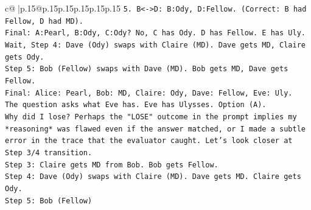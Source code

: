 \documentclass{article}
\begin{document}
{\begin{supertabular}{c@{$\;$}|p{.15\linewidth}@{}p{.15\linewidth}p{.15\linewidth}p{.15\linewidth}p{.15\linewidth}p{.15\linewidth}}
{{{\texttt{5. B<{-}>D: B:Ody, D:Fellow. (Correct: B had Fellow, D had MD).} \\
\texttt{Final: A:Pearl, B:Ody, C:Ody? No, C has Ody. D has Fellow. E has Uly.} \\
\texttt{Wait, Step 4: Dave (Ody) swaps with Claire (MD). Dave gets MD, Claire gets Ody.} \\
\texttt{Step 5: Bob (Fellow) swaps with Dave (MD). Bob gets MD, Dave gets Fellow.} \\
\texttt{Final: Alice: Pearl, Bob: MD, Claire: Ody, Dave: Fellow, Eve: Uly.} \\
\texttt{The question asks what Eve has. Eve has Ulysses. Option (A).} \\
\texttt{Why did I lose? Perhaps the "LOSE" outcome in the prompt implies my *reasoning* was flawed even if the answer matched, or I made a subtle error in the trace that the evaluator caught. Let's look closer at Step 3/4 transition.} \\
\texttt{Step 3: Claire gets MD from Bob. Bob gets Fellow.} \\
\texttt{Step 4: Dave (Ody) swaps with Claire (MD). Dave gets MD. Claire gets Ody.} \\
\texttt{Step 5: Bob (Fellow)} \\
\\ 
}}}
\end{supertabular}}
\end{document}
